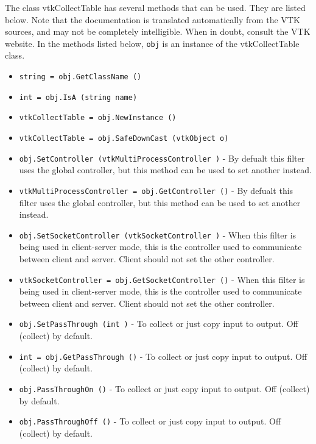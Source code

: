 The class vtkCollectTable has several methods that can be used.
  They are listed below.
Note that the documentation is translated automatically from the VTK sources,
and may not be completely intelligible.  When in doubt, consult the VTK website.
In the methods listed below, \verb|obj| is an instance of the vtkCollectTable class.
\begin{itemize}
\item  \verb|string = obj.GetClassName ()|

\item  \verb|int = obj.IsA (string name)|

\item  \verb|vtkCollectTable = obj.NewInstance ()|

\item  \verb|vtkCollectTable = obj.SafeDownCast (vtkObject o)|

\item  \verb|obj.SetController (vtkMultiProcessController )| -  By defualt this filter uses the global controller,
 but this method can be used to set another instead.

\item  \verb|vtkMultiProcessController = obj.GetController ()| -  By defualt this filter uses the global controller,
 but this method can be used to set another instead.

\item  \verb|obj.SetSocketController (vtkSocketController )| -  When this filter is being used in client-server mode,
 this is the controller used to communicate between
 client and server.  Client should not set the other controller.

\item  \verb|vtkSocketController = obj.GetSocketController ()| -  When this filter is being used in client-server mode,
 this is the controller used to communicate between
 client and server.  Client should not set the other controller.

\item  \verb|obj.SetPassThrough (int )| -  To collect or just copy input to output. Off (collect) by default.

\item  \verb|int = obj.GetPassThrough ()| -  To collect or just copy input to output. Off (collect) by default.

\item  \verb|obj.PassThroughOn ()| -  To collect or just copy input to output. Off (collect) by default.

\item  \verb|obj.PassThroughOff ()| -  To collect or just copy input to output. Off (collect) by default.

\end{itemize}
